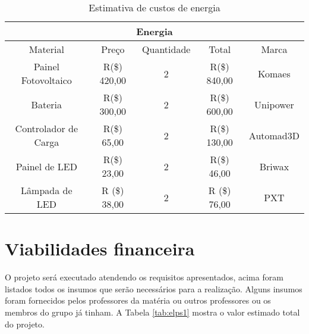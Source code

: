\begin{table}[h]
\caption{Estimativa de custos de energia}
\label{tab:custos_energia}
\begin{tabular}{|c|c|c|c|c|}
\hline
\multicolumn{5}{|c|}{Energia}                                                 \\ \hline
Material             & Preço         & Quantidade & Total         & Marca     \\ \hline
Painel Fotovoltaico  & R(\$) 420,00  & 2          & R(\$) 840,00  & Komaes    \\ \hline
Bateria              & R(\$) 300,00  & 2          & R(\$) 600,00  & Unipower  \\ \hline
Controlador de Carga & R(\$) 65,00  & 2          & R(\$) 130,00  & Automad3D \\ \hline
Painel de LED        & R(\$) 23,00  & 2          & R(\$) 46,00 & Briwax    \\ \hline
Lâmpada de LED       & R (\$) 38,00 & 2          & R (\$) 76,00 & PXT         \\ \hline
\end{tabular}
\end{table}

\section{Viabilidades financeira}

O projeto será executado atendendo os requisitos apresentados, acima foram listados todos os insumos que serão necessários para a realização. Alguns insumos foram fornecidos pelos professores da matéria ou outros professores ou os membros do grupo já tinham. A Tabela \ref{tab:elps1} mostra o valor estimado total do projeto. 

